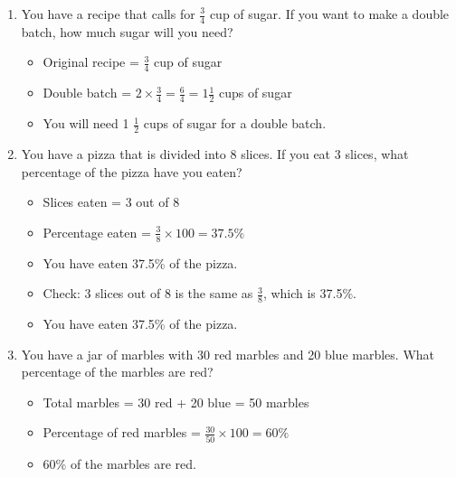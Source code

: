 \begin{enumerate}[label=(\alph*)]
\begin{itemize}
        \end{itemize}
    \item You have a recipe that calls for $\frac{3}{4}$ cup of sugar. If you want to make a double batch, how much sugar will you need?
        \begin{itemize}
            \item Original recipe = $\frac{3}{4}$ cup of sugar
            \item Double batch = $2 \times \frac{3}{4} = \frac{6}{4} = 1 \frac{1}{2}$ cups of sugar
            \item You will need 1 $\frac{1}{2}$ cups of sugar for a double batch.
        \end{itemize}
    \item You have a pizza that is divided into 8 slices. If you eat 3 slices, what percentage of the pizza have you eaten?
        \begin{itemize}
            \item Slices eaten = 3 out of 8
            \item Percentage eaten = $\frac{3}{8} \times 100 = 37.5\%$
            \item You have eaten 37.5\% of the pizza.
            \item Check: 3 slices out of 8 is the same as $\frac{3}{8}$, which is 37.5\%.
            \item You have eaten 37.5\% of the pizza.
        \end{itemize}
    \item You have a jar of marbles with 30 red marbles and 20 blue marbles. What percentage of the marbles are red?
        \begin{itemize}
            \item Total marbles = 30 red + 20 blue = 50 marbles
            \item Percentage of red marbles = $\frac{30}{50} \times 100 = 60\%$
            \item 60\% of the marbles are red.
        \end{itemize}
\end{enumerate}